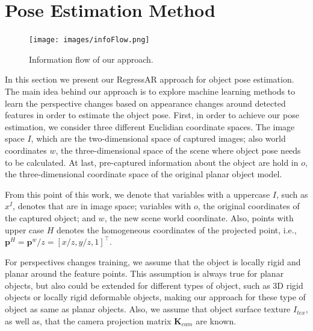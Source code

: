 \documentclass[annual]{acmsiggraph}
\begin{document}
\section{Pose Estimation Method}
\label{sec:poseMethod}


\begin{figure}[t]
\texttt{[image: images/infoFlow.png]}
\caption{Information flow of our approach.}
\label{img:inforFlow}
\end{figure}
	
	

In this section we present our RegressAR approach for object pose estimation. The main idea behind our approach is to explore machine learning methods to learn the perspective changes based on appearance changes around detected features in order to estimate the object pose. First, in order to achieve our pose estimation, we consider three different Euclidian coordinate spaces. The image space $I$, which are the two-dimensional space of captured images; also world coordinates $w$, the three-dimensional space of the scene where object pose needs to be calculated. At last, pre-captured  information about the object are hold in $o$, the three-dimensional coordinate space of the original planar object model. 

From this point of this work, we denote that variables with a uppercase $I$, such as $x^I$, denotes that are in image space; variables with $o$, the original coordinates of the captured object; and $w$, the new scene world coordinate. Also, points with upper case $H$ denotes the homogeneous coordinates of the projected point, i.e., $\mathbf{p}^H = \mathbf{p}^w/z = [x/z, y/z, 1]^\top$. 

For perspectives changes training, we assume that the object is locally rigid and planar around the feature points. This assumption is always true for planar objects, but also could be extended for different types of object, such as 3D rigid objects or locally rigid deformable objects, making our approach for these type of object as same as planar objects. Also, we assume that object surface texture $I_{tex}$, as well as, that the camera projection matrix $\mathbf{K}_{cam}$ are known. 

\end{document}
